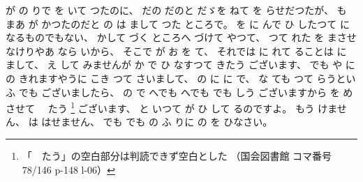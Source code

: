 が
の
りで
%
を
いて
つたのに、
%
だの
だのと
だゞを
ねて
を
らせだつたが、
%
も
まあ
が
かつたのだと
の
は
まして
つた
ところで。
%
を
に
んで
ひ
したつて
になるものでもない、
%
かして
づく
ところへ
づけて
やつて、
%
つて
れた
を
まさせ
なけりやあ
なら
いから、
%
%
そこで
が
お
を
て、
%
それでは
に
れて
ることは
に
まして、
%
え
して
みませんが
か
で
ひ
なすつて
きたう
ございます、
%
でも
や
に
の
きれますやうに
こき
つて
さいまして、
%
の
に
に
で、
%
な
ても
つて
らうといふ
でも
ございましたら、
%
の
で
へでも
へでも
でも
しう
ございますから
を
めさせて
　たう%
\footnote{「　たう」の空白部分は判読できず空白とした
（国会図書館 コマ番号78/146 p-148 l-06）}%
ございます、
%
と
いつて
が%
ひ
して
るのですよ。
%
もう
けません、
%
は
はせません、
%
でも
でも
の
ふ
りに
の
を
ひなさい。
